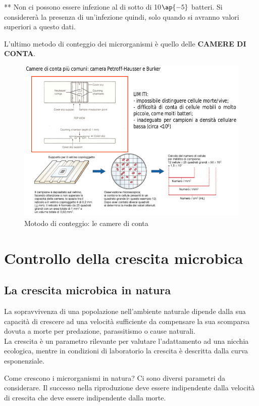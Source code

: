 \documentclass[11pt]{book}
\begin{document}
\clearpage
** Non ci possono essere infezione al di sotto di 10$\ap{-5}$ batteri. Si considererà la presenza di un'infezione quindi, solo quando si avranno valori superiori a questo dati.

\vspace{1em}
L'ultimo metodo di conteggio dei microrganismi è quello delle \textbf{CAMERE DI CONTA}.


\begin{figure}[htp]
\centering
\includegraphics[scale=0.5]{img/Camere di conta.png}
\caption{Motodo di conteggio: le camere di conta}
\label{}
\end{figure}

\chapter{Controllo della crescita microbica}
\section{La crescita microbica in natura}
La sopravvivenza di una popolazione nell’ambiente naturale dipende dalla sua capacità di crescere ad una velocità sufficiente da compensare la sua scomparsa dovuta a morte per predazione, parassitismo o cause naturali.\\
La crescita è un parametro rilevante per valutare l’adattamento ad una nicchia ecologica, mentre in condizioni di laboratorio la crescita è descritta dalla curva esponenziale.

Come crescono i microrganismi in natura? Ci sono diversi parametri da considerare. Il successo nella riproduzione deve essere indipendente dalla velocità di crescita che deve essere indipendente dalla morte.
\end{document}
